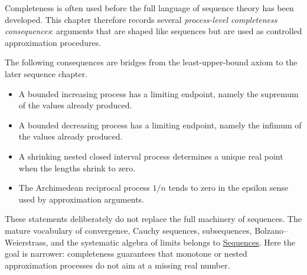 
\begin{remark*}[Exposition]
Completeness is often used before the full language of sequence theory has
been developed.  This chapter therefore records several
\emph{process-level completeness consequences}: arguments that are shaped like
sequences but are used as controlled approximation procedures.
\end{remark*}

\begin{remark*}
The following consequences are bridges from the least-upper-bound axiom to the
later sequence chapter.
\begin{itemize}
  \item A bounded increasing process has a limiting endpoint, namely the
  supremum of the values already produced.
  \item A bounded decreasing process has a limiting endpoint, namely the
  infimum of the values already produced.
  \item A shrinking nested closed interval process determines a unique real
  point when the lengths shrink to zero.
  \item The Archimedean reciprocal process $1/n$ tends to zero in the
  epsilon sense used by approximation arguments.
\end{itemize}
\end{remark*}

\begin{remark*}
These statements deliberately do not replace the full machinery of sequences.
The mature vocabulary of convergence, Cauchy sequences, subsequences,
Bolzano--Weierstrass, and the systematic algebra of limits belongs to
\hyperref[chap:sequences]{Sequences}.  Here the goal is narrower: completeness
guarantees that monotone or nested approximation processes do not aim at a
missing real number.
\end{remark*}
